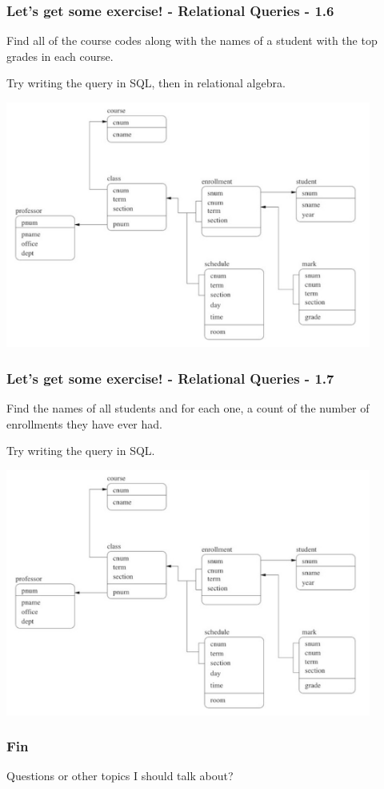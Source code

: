 \begin{frame}
\frametitle{Let's get some exercise! - Relational Queries - 1.6}

Find all of the course codes along with the names of a student with the top grades in each course.

Try writing the query in SQL, then in relational algebra.

\begin{center}
  \includegraphics[width=0.9\textwidth]{images/db-schema.png}
\end{center}

\end{frame}


\begin{frame}
\frametitle{Let's get some exercise! - Relational Queries - 1.7}

Find the names of all students and for each one, a count of the number of enrollments they have ever had.

Try writing the query in SQL.

\begin{center}
  \includegraphics[width=0.9\textwidth]{images/db-schema.png}
\end{center}

\end{frame}


\begin{frame}
\frametitle{Fin}

Questions or other topics I should talk about?

\end{frame}

